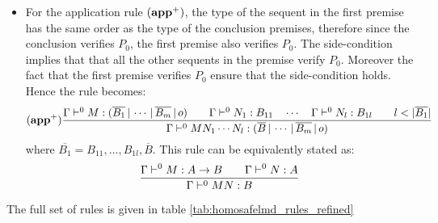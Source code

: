 \begin{itemize}
\item For the application rule $\mathbf{(app^+)}$, the type of the sequent in the first premise has the same order
as the type of the conclusion premises, therefore since the conclusion verifies $P_0$, the first premise also verifies $P_0$.
The side-condition implies that that all the other sequents in the premise verify $P_0$. Moreover the fact
that the first premise verifies $P_0$ ensure that the side-condition holds. Hence the rule becomes:
$$ \mathbf{(app^+)} {
    {
        \Gamma \vdash^0 M : (\overline{B_1} \, | \, \cdots \, | \, \overline{B_m} \, | \, o) \qquad
        \Gamma \vdash^0 N_1 : B_{11} \quad \cdots \quad \Gamma \vdash^0 N_{l} : B_{1l} \qquad l < |\overline{B_1}|
    }
    \over{
        \Gamma \vdash^0 M N_1 \cdots N_{l} : (\overline{B} \, | \, \cdots \, | \, \overline{B_m} \, | \, o)
    }
    }
$$
where $\overline{B_1} = B_{11}, \ldots, B_{1l},\overline{B}$.
This rule can be equivalently stated as:
$$ \frac{\displaystyle \Gamma \vdash^0 M : A\rightarrow B
                                        \qquad \Gamma \vdash^{0} N : A
                                   }{\Gamma  \vdash^{0} M N : B}$$
\end{itemize}

The full set of rules is given in table \ref{tab:homosafelmd_rules_refined}

